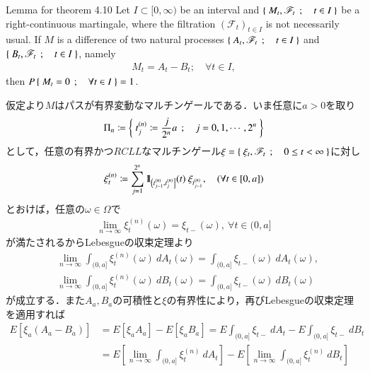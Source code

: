 	\begin{itembox}[l]{Lemma for theorem 4.10}\label{lem:uniqueness_of_Doob_Meyer_decomposition}
		Let $I \subset [0,\infty)$ be an interval and 
		$\left\{\ M_t,\mathscr{F}_t\ \, ; \quad t \in I\ \right\}$ be a right-continuous martingale,
		where the filtration $(\mathscr{F}_t)_{t \in I}$ is not necessarily usual.
		If $M$ is a difference of two natural processes 
		$\left\{\ A_t,\mathscr{F}_t\ \, ; \quad t \in I\ \right\}$
		and $\left\{\ B_t,\mathscr{F}_t\ \, ; \quad t \in I\ \right\}$, namely
		\begin{align}
			M_t = A_t - B_t; \quad \forall t \in I,
		\end{align}
		then $P\left\{\ M_t = 0\ \, ; \quad \forall t \in I\ \right\} = 1$.
	\end{itembox}
	
	\begin{prf}
		仮定より$M$はパスが有界変動なマルチンゲールである．いま任意に$a > 0$を取り
		\begin{align}
			\Pi_n \coloneqq \left\{\ t^{(n)}_j \coloneqq \frac{j}{2^n}a\ \, ; \quad j=0,1,\cdots,2^n\ \right\}
		\end{align}
		として，任意の有界かつ$RCLL$なマルチンゲール$\xi = \left\{\ \xi_t,\mathscr{F}_t\ \, ; \quad 0 \leq t < \infty\ \right\}$に対し
		\begin{align}
			\xi^{(n)}_t \coloneqq \sum_{j=1}^{2^n} \mbox{1}\hspace{-0.25em}\mbox{l}_{\left(t_{j-1}^{(n)},t_j^{(n)}\right]}(t)\ \xi_{t^{(n)}_{j-1}},
			\quad (\forall t \in [0,a])
		\end{align}
		とおけば，任意の$\omega \in \Omega$で
		\begin{align}
			\lim_{n \to \infty} \xi^{(n)}_t(\omega) = \xi_{t-}(\omega),\ \forall t \in (0,a]
		\end{align}
		が満たされるからLebesgueの収束定理より
		\begin{align}
			&\lim_{n \to \infty} \int_{(0,a]} \xi^{(n)}_t(\omega)\ dA_t(\omega) = \int_{(0,a]} \xi_{t-}(\omega)\ dA_t(\omega), \\
			&\lim_{n \to \infty} \int_{(0,a]} \xi^{(n)}_t(\omega)\ dB_t(\omega) = \int_{(0,a]} \xi_{t-}(\omega)\ dB_t(\omega)
		\end{align}
		が成立する．また$A_a,B_a$の可積性と$\xi$の有界性により，再びLebesgueの収束定理を適用すれば
		\begin{align}
			E\left[ \xi_a\left( A_a - B_a \right) \right]
			&= E\left[ \xi_a A_a \right] -  E\left[ \xi_a B_a \right]
			= E \int_{(0,a]} \xi_{t-}\ dA_t - E\int_{(0,a]} \xi_{t-}\ dB_t \\
			&= E \left[ \lim_{n \to \infty} \int_{(0,a]} \xi^{(n)}_t\ dA_t \right]
				- E \left[ \lim_{n \to \infty} \int_{(0,a]} \xi^{(n)}_t\ dB_t \right] \\

\end{align}
\end{prf}
